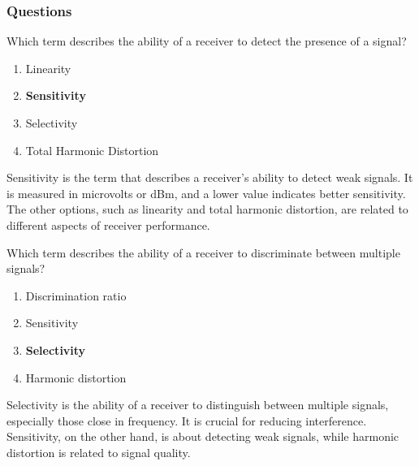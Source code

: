 \subsubsection*{Questions}

\begin{tcolorbox}[colback=gray!10!white,colframe=black!75!black,title={T7A01}]
    Which term describes the ability of a receiver to detect the presence of a signal?
    \begin{enumerate}[label=\Alph*),noitemsep]
        \item Linearity
        \item \textbf{Sensitivity}
        \item Selectivity
        \item Total Harmonic Distortion
    \end{enumerate}
\end{tcolorbox}

Sensitivity is the term that describes a receiver's ability to detect weak signals. It is measured in microvolts or dBm, and a lower value indicates better sensitivity. The other options, such as linearity and total harmonic distortion, are related to different aspects of receiver performance.

\begin{tcolorbox}[colback=gray!10!white,colframe=black!75!black,title={T7A04}]
    Which term describes the ability of a receiver to discriminate between multiple signals?
    \begin{enumerate}[label=\Alph*),noitemsep]
        \item Discrimination ratio
        \item Sensitivity
        \item \textbf{Selectivity}
        \item Harmonic distortion
    \end{enumerate}
\end{tcolorbox}

Selectivity is the ability of a receiver to distinguish between multiple signals, especially those close in frequency. It is crucial for reducing interference. Sensitivity, on the other hand, is about detecting weak signals, while harmonic distortion is related to signal quality.
